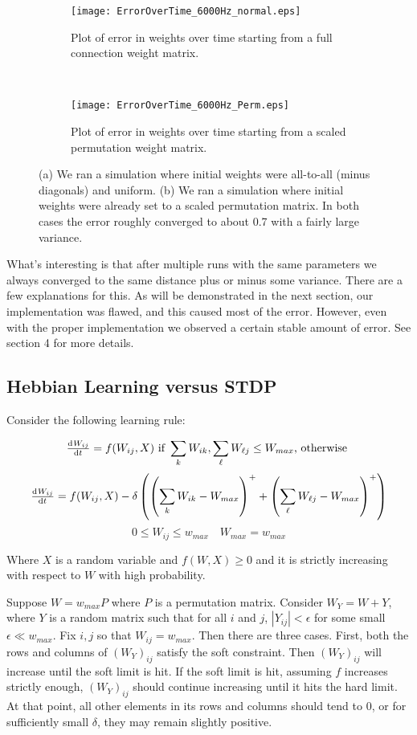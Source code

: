 \begin{figure}[H]
\centering
\begin{subfigure}[b]{0.49\textwidth}
\texttt{[image: ErrorOverTime\_6000Hz\_normal.eps]}
\caption{Plot of error in weights over time starting from a full connection weight matrix.}
\label{Error_over_time: normal}
\end{subfigure}
\,
\begin{subfigure}[b]{0.49\textwidth}
\texttt{[image: ErrorOverTime\_6000Hz\_Perm.eps]}
\caption{Plot of error in weights over time starting from a scaled permutation weight matrix.}
\label{Error_over_time: permutation}
\end{subfigure}
\caption{(a) We ran a simulation where initial weights were all-to-all (minus diagonals) and uniform. (b) We ran a simulation where initial weights were already set to a scaled permutation matrix. In both cases the error roughly converged to about 0.7 with a fairly large variance.}
\label{Error_over_time}
\end{figure}

What's interesting is that after multiple runs with the same parameters we always converged to the same distance plus or minus some variance. There are a few explanations for this. As will be demonstrated in the next section, our implementation was flawed, and this caused most of the error. However, even with the proper implementation we observed a certain stable amount of error. See section 4 for more details.


\subsection{Hebbian Learning versus STDP}

Consider the following learning rule:

\[\od{W_{ij}}{t} = f(W_{ij},X) \text{ if } \sum_k W_{ik}, \sum_\ell W_{\ell j} \leq W_{max}\text{, otherwise }\]
\[\od{W_{ij}}{t} = f(W_{ij},X) - \delta\left(\left(\sum_k W_{ik} - W_{max}\right)^+ + \left(\sum_\ell W_{\ell j} - W_{max}\right)^+\right)\]
\[0\leq W_{ij} \leq w_{max} \quad W_{max} = w_{max}\]

Where \(X\) is a random variable and \(f(W,X) \geq 0\) and it is strictly increasing with respect to \(W\) with high probability.

Suppose \(W = w_{max}P\) where \(P\) is a permutation matrix. Consider \(W_Y = W + Y\), where \(Y\) is a random matrix such that for all \(i\) and \(j\), \(|Y_{ij}|< \epsilon\) for some small \(\epsilon \ll w_{max}\). Fix \(i,j\) so that \(W_{ij} = w_{max}\). Then there are three cases. First, both the rows and columns of \((W_Y)_{ij}\) satisfy the soft constraint. Then \((W_Y)_{ij}\) will increase until the soft limit is hit. If the soft limit is hit, assuming \(f\) increases strictly enough, \((W_Y)_{ij}\) should continue increasing until it hits the hard limit. At that point, all other elements in its rows and columns should tend to 0, or for sufficiently small \(\delta\), they may remain slightly positive.

